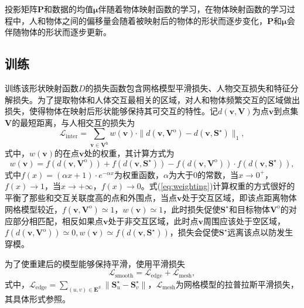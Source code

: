 投影矩阵$\mathbf{P}$和数据的均值$\mathbf{\mu}$伴随着物体映射函数的学习，在物体映射函数的学习过程中，人和物体之间的偏移量会随着被映射后的物体的形状而逐步变化，$\mathbf{P}$和$\mathbf{\mu}$会伴随物体的形状而逐步更新。

\subsection{训练}
训练该形状映射函数$D$的损失函数包含网格模型平滑损失、人物交互损失和特征分解损失。为了提取物体和人体交互最相关的区域，对人和物体频繁交互的区域做出损失，使得物体在映射后形状能够保持其可交互的特性。记$d(\mathbf{v}, \mathbf{V})$为点$\mathbf{v}$到点集$\mathbf{V}$的最短距离，与人相交互的损失为
\begin{equation}
	\mathcal{L}_{\text{inter}} = \sum_{\mathbf{v} \in \mathbf{V}^{\text{h}}} w(\mathbf{v}) \cdot \| d(\mathbf{v}, \mathbf{V}^{\text{o}}) - d(\mathbf{v}, \mathbf{S}^{\star}) \|_1,
\end{equation}
式中，$w(\mathbf{v})$的在点$\mathbf{v}$处的权重，其计算方式为
\begin{equation}\label{eq:weighting}
	w(\mathbf{v}) = f(d(\mathbf{v}, \mathbf{V}^\text{o})) + f(d(\mathbf{v}, \mathbf{S}^\star)) - f(d(\mathbf{v}, \mathbf{V}^\text{o})) \cdot f(d(\mathbf{v}, \mathbf{S}^\star)),
\end{equation}
式中$f(x) = (\alpha x + 1) \cdot e^{- \alpha x}$为权重函数，$\alpha$为大于0的常数，当$x\to 0^+$，$f(x) \to 1$，当$x\to +\infty$，$f(x)\to0$。式(\ref{eq:weighting})计算权重的方式很好的平衡了那些和交互关联度高的点和外围点，当点$\mathbf{v}$处于交互区域，即该点距离物体网格模型较近，$f(\mathbf{v}, \mathbf{V}^{\text{o}}) \simeq 1$，$w(\mathbf{v}) \simeq 1$，此时损失促使$\mathbf{S}^\star$和目标物体$\mathbf{V}^\text{o}$的对应部分相匹配，相反如果点$\mathbf{v}$处于非交互区域，此时点$\mathbf{v}$周围应该处于空区域，$f(d(\mathbf{v}, \mathbf{V}^\text{o})) \simeq 0, w(\mathbf{v}) \simeq f(d(\mathbf{v}, \mathbf{S}^\star))$，损失会促使$\mathbf{S}^\star$远离该点以防发生穿模。

为了使重建后的模型能够保持平滑，使用平滑损失
\begin{equation}
	\mathcal{L}_\text{smooth} = \mathcal{L}_{\text{edge}} + \mathcal{L}_{\text{mesh}},
\end{equation}
式中，$\mathcal{L}_{\text{edge}} = \sum_{(u, v) \in \mathbf{E}^{\mathcal{S}}} \| \mathbf{S}^\star_u - \mathbf{S}_v^\star \|$，$\mathcal{L}_{\text{mesh}}$为网格模型的拉普拉斯平滑损失，其具体形式参照\citep{Nealen2006LaplacianMO}。

